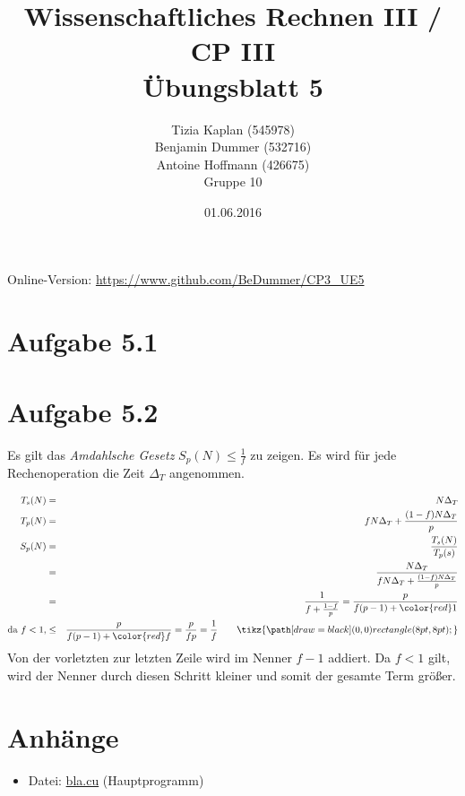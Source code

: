 \documentclass[%
	paper=A4,	%
	pagesize,	%
	DIV=calc,	%
	smallheadings,	%
	ngerman		%
]{scrartcl}
\title{{\bf Wissenschaftliches Rechnen III / CP III}\\Übungsblatt 5}
\author{Tizia Kaplan (545978)\\Benjamin Dummer (532716)\\Antoine Hoffmann (426675)\\Gruppe 10}
\date{01.06.2016}
\newcommand{\mycbox}[1]{\tikz{\path[draw=#1] (0,0) rectangle (8pt,8pt);}}
\begin{document}
\maketitle
Online-Version: \href{https://www.github.com/BeDummer/CP3_UE5}{\url{https://www.github.com/BeDummer/CP3_UE5}}

\section*{Aufgabe 5.1}

\section*{Aufgabe 5.2}
Es gilt das \emph{Amdahlsche Gesetz} $S_p(N) \leq \frac{1}{f} $ zu zeigen. Es wird für jede Rechenoperation die Zeit $\Delta_T$ angenommen.

\begin{eqnarray}
	T_s (N) & = & N \Delta_T \\
	T_p (N) & = & f N \Delta_T + \dfrac{(1-f)N \Delta_T}{p} \\
	S_p (N) & = & \dfrac{T_s(N)}{T_p(s)} \\
		& = & \dfrac{N \Delta_T}{f N \Delta_T + \frac{(1-f) N \Delta_T}{p}} \nonumber \\
		& = & \dfrac{1}{f+\frac{1-f}{p}} = \dfrac{p}{f (p-1) +\color{red} 1} \nonumber \\
	\mbox{da } f < 1, & \leq & \dfrac{p}{f (p-1) +\color{red} f} = \dfrac{p}{f p} = \dfrac{1}{f} \quad \quad \mycbox{black} \nonumber
\end{eqnarray}
Von der vorletzten zur letzten Zeile wird im Nenner $f-1$ addiert. Da $f<1$ gilt, wird der Nenner durch diesen Schritt kleiner und somit der gesamte Term größer.

\section*{Anhänge}
\begin{itemize}
	\item Datei: \url{bla.cu} (Hauptprogramm)
\end{itemize}
\end{document}
